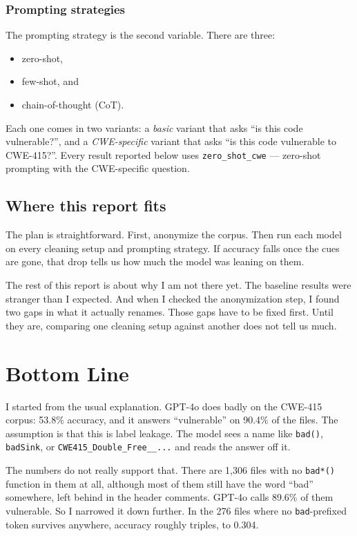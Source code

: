 \documentclass[11pt]{article}
\begin{document}
\subsubsection*{Prompting strategies}
The prompting strategy is the second variable. There are three:

\begin{itemize}[leftmargin=*]
  \item zero-shot,
  \item few-shot, and
  \item chain-of-thought (CoT).
\end{itemize}

Each one comes in two variants: a \emph{basic} variant that asks ``is this code vulnerable?'',
and a \emph{CWE-specific} variant that asks ``is this code vulnerable to CWE-415?''. Every result
reported below uses \texttt{zero\_shot\_cwe} --- zero-shot prompting with the CWE-specific
question.


\subsection*{Where this report fits}

The plan is straightforward. First, anonymize the corpus. Then run each model on every cleaning
setup and prompting strategy. If accuracy falls once the cues are gone, that drop tells us how
much the model was leaning on them.

The rest of this report is about why I am not there yet. The baseline results were stranger than
I expected. And when I checked the anonymization step, I found two gaps in what it actually
renames. Those gaps have to be fixed first. Until they are, comparing one cleaning setup against
another does not tell us much.

\section{Bottom Line}
\label{sec:bottomline}

I started from the usual explanation. GPT-4o does badly on the CWE-415 corpus: 53.8\% accuracy,
and it answers ``vulnerable'' on 90.4\% of the files. The assumption is that this is label
leakage. The model sees a name like \texttt{bad()}, \texttt{badSink}, or
\texttt{CWE415\_Double\_Free\_\_...} and reads the answer off it.

The numbers do not really support that. There are 1,306 files with no \texttt{bad*()} function in
them at all, although most of them still have the word ``bad'' somewhere, left behind in the
header comments. GPT-4o calls 89.6\% of them vulnerable. So I narrowed it down further. In the
276 files where no \texttt{bad}-prefixed token survives anywhere, accuracy roughly triples, to
0.304.
\end{document}
